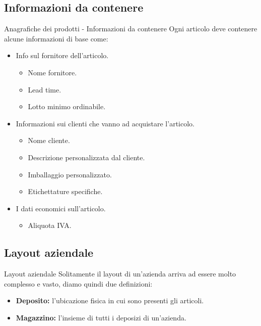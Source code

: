 \documentclass{beamer}
\begin{document}
\subsection{Informazioni da contenere}
\begin{frame}{Anagrafiche dei prodotti - Informazioni da contenere}
    Ogni articolo deve contenere alcune informazioni di base come:
    \begin{itemize}
        \item Info sul fornitore dell'articolo.
        \begin{itemize}
            \item Nome fornitore.
            \item Lead time.
            \item Lotto minimo ordinabile.
        \end{itemize}
        \item Informazioni sui clienti che vanno ad acquistare l'articolo.
        \begin{itemize}
            \item Nome cliente.
            \item Descrizione personalizzata dal cliente.
            \item Imballaggio personalizzato.
            \item Etichettature specifiche.
        \end{itemize}
        \item I dati economici sull'articolo.
        \begin{itemize}
            \item Aliquota IVA.
        \end{itemize}
    \end{itemize}
\end{frame}

\subsection{Layout aziendale}
\begin{frame}{Layout aziendale}
    Solitamente il layout di un'azienda arriva ad essere molto complesso e vasto, diamo quindi due definizioni:
    \begin{itemize}
        \item \textbf{Deposito:} l'ubicazione fisica in cui sono presenti gli articoli.
        \item \textbf{Magazzino:} l'insieme di tutti i deposizi di un'azienda.
    \end{itemize}
\end{frame}
\end{document}
